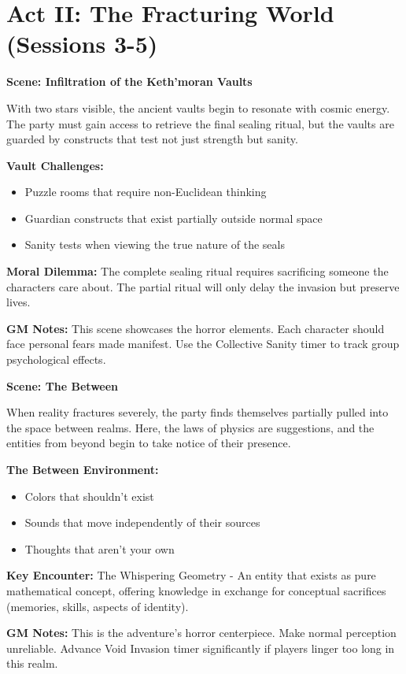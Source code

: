 \documentclass[12pt,twoside]{article}
\newenvironment{scene}[1]{%
  \vspace{0.5cm}
  \begin{center}
    \textbf{\large Scene: #1}
  \end{center}
  \vspace{0.3cm}
}{}
\begin{document}
\section{Act II: The Fracturing World (Sessions 3-5)}

\begin{scene}{Infiltration of the Keth'moran Vaults}
With two stars visible, the ancient vaults begin to resonate with cosmic energy. The party must gain access to retrieve the final sealing ritual, but the vaults are guarded by constructs that test not just strength but sanity.

\textbf{Vault Challenges:}
\begin{itemize}[leftmargin=*]
\item Puzzle rooms that require non-Euclidean thinking
\item Guardian constructs that exist partially outside normal space
\item Sanity tests when viewing the true nature of the seals
\end{itemize}

\textbf{Moral Dilemma:} The complete sealing ritual requires sacrificing someone the characters care about. The partial ritual will only delay the invasion but preserve lives.

\textbf{GM Notes:} This scene showcases the horror elements. Each character should face personal fears made manifest. Use the Collective Sanity timer to track group psychological effects.
\end{scene}

\begin{scene}{The Between}
When reality fractures severely, the party finds themselves partially pulled into the space between realms. Here, the laws of physics are suggestions, and the entities from beyond begin to take notice of their presence.

\textbf{The Between Environment:}
\begin{itemize}[leftmargin=*]
\item Colors that shouldn't exist
\item Sounds that move independently of their sources
\item Thoughts that aren't your own
\end{itemize}

\textbf{Key Encounter:} The Whispering Geometry - An entity that exists as pure mathematical concept, offering knowledge in exchange for conceptual sacrifices (memories, skills, aspects of identity).

\textbf{GM Notes:} This is the adventure's horror centerpiece. Make normal perception unreliable. Advance Void Invasion timer significantly if players linger too long in this realm.
\end{scene}
\end{document}

